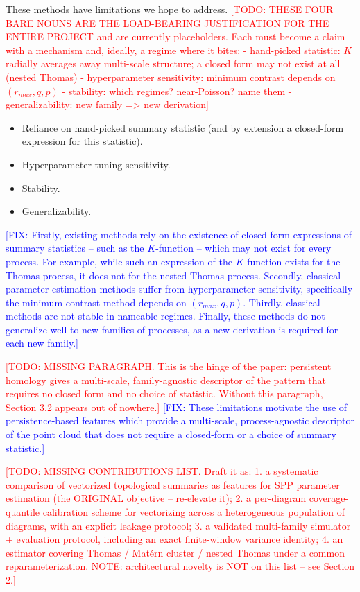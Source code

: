 \documentclass[11pt,letterpaper]{article}
\newcommand{\1}{\mathds{1}}
\newcommand{\todo}[1]{\textcolor{red}{[TODO: #1]}}
\newcommand{\fix}[1]{\textcolor{blue}{[FIX: #1]}}
\newcommand{\todo}[1]{}
\newcommand{\fix}[1]{}
\theoremstyle{plain}
\theoremstyle{definitioncolon}
\begin{document}
These methods have limitations we hope to address.
\todo{THESE FOUR BARE NOUNS ARE THE LOAD-BEARING JUSTIFICATION FOR THE ENTIRE
PROJECT and are currently placeholders. Each must become a claim with a
mechanism and, ideally, a regime where it bites:
 - hand-picked statistic: $K$ radially averages away multi-scale structure;
   a closed form may not exist at all (nested Thomas)
 - hyperparameter sensitivity: minimum contrast depends on $(r_{max}, q, p)$
 - stability: which regimes? near-Poisson? name them
 - generalizability: new family => new derivation}
\begin{itemize}[nosep]
  \item Reliance on hand-picked summary statistic (and by extension a
        closed-form expression for this statistic).
  \item Hyperparameter tuning sensitivity.
  \item Stability.
  \item Generalizability.
\end{itemize}
\fix{Firstly, existing methods rely on the existence of closed-form expressions of
summary statistics -- such as the $K$-function -- which may not exist for every process.
For example, while such an expression of the $K$-function exists for the Thomas process,
it does not for the nested Thomas process. Secondly, classical parameter estimation
methods suffer from hyperparameter sensitivity, specifically the minimum contrast method
depends on $(r_{max}, q, p)$. Thirdly, classical methods are not stable in nameable regimes.
Finally, these methods do not generalize well to new families of processes, as a new derivation
is required for each new family.}

\todo{MISSING PARAGRAPH. This is the hinge of the paper: persistent homology
gives a multi-scale, family-agnostic descriptor of the pattern that requires no
closed form and no choice of statistic. Without this paragraph, Section 3.2
appears out of nowhere.}
\fix{These limitations motivate the use of persistence-based features which provide a
multi-scale, process-agnostic descriptor of the point cloud that does not require
a closed-form or a choice of summary statistic.}

\todo{MISSING CONTRIBUTIONS LIST. Draft it as:
 1. a systematic comparison of vectorized topological summaries as features for
    SPP parameter estimation (the ORIGINAL objective -- re-elevate it);
 2. a per-diagram coverage-quantile calibration scheme for vectorizing across a
    heterogeneous population of diagrams, with an explicit leakage protocol;
 3. a validated multi-family simulator + evaluation protocol, including an exact
    finite-window variance identity;
 4. an estimator covering Thomas / Mat\'ern cluster / nested Thomas under a
    common reparameterization.
NOTE: architectural novelty is NOT on this list -- see Section 2.}
\end{document}
